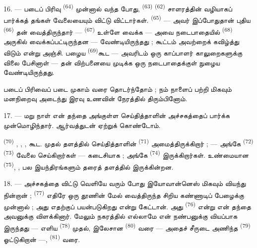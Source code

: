 16. --- படைப் பிரிவு  \textsuperscript{(64)}
முன்னால் வந்த போது,  \textsuperscript{(63)}
 \textsuperscript{(62)} சாளரத்தின் வழியாகப்
பார்க்கத் தங்கள்  வேலையையும்
விட்டு விட்டார்கள்.  \textsuperscript{(65)} —
அவர் இப்போதுதான் புதிய  \textsuperscript{(66)} தன்
 வைத்திருந்தார் —  \textsuperscript{(67)}  உள்ளே வைக்க — அவை நடைபாதையில்  \textsuperscript{(68)} அருகில் வைக்கப்பட்டிருந்தன —
வேண்டியிருந்தது ; கூட்டம் அவற்றைக் கவிழ்த்து விடும் என்று அஞ்சி.
பழைய 
\textsuperscript{(69)}கூட — அவரிடம் ஒரு காப்பாளர் காலுறைகளுக்கு
விலை பேசினாள் — தன் விற்பனையை முடிக்க ஒரு நடைபாதைக்குள் நுழைய
வேண்டியிருந்தது.

படைப் பிரிவைப் படை முகாம் வரை தொடர்ந்தோம் ;  நம்
நாளைப் பற்றி மிகவும் மனநிறைவு அடைந்து இரவு உணவின் நேரத்தில்
திரும்பினோம்.

\VUsaut{3.0mm}

17. --- மறு நாள் என் தந்தை அங்குள்ள செய்தித்தாளின் அச்சகத்தைப்
பார்க்க முன்மொழிந்தார். ஆர்வத்துடன் ஏற்றுக் கொண்டோம்.

  \textsuperscript{(70)}
, ,
,  கூட. முதல்
தளத்தில் செய்தித்தாளின் 
\textsuperscript{(71)} அமைத்திருக்கிறார் ;  — அங்கே 
\textsuperscript{(72)} 
\textsuperscript{(73)} வேலை செய்கிறார்கள் — கடைசியாக
 ; அங்கே  \textsuperscript{(74)} இருக்கிறார்கள். உண்மையான
 \textsuperscript{(75)}, , பல இயந்திரங்களும் தரைத் தளத்தில் இருக்கின்றன.

\VUsaut{3.0mm}

18. --- அச்சகத்தை விட்டு வெளியே வரும் போது இயோவான்னெஸ் மிகவும்
வியந்து நின்றான் ;  \textsuperscript{(77)}
எதிரே ஒரு தூணின் மேல் வைத்திருந்த சிறிய கண்ணாடிப் பேழைக்கு
முன்னால் ; அது எதற்குப் பயன்படுகிறது என்று கேட்டான். அது  \textsuperscript{(76)} என்று என் தந்தை அவனுக்கு
விளக்கினார். மேலும் நகரத்தில் எல்லாமே என் நண்பனுக்கு வியப்பாக
இருந்தது — எளிய  \textsuperscript{(78)}
முதல், இலேசான  \textsuperscript{(80)} வரை —
அதைச் சீருடை அணிந்த  \textsuperscript{(79)}
ஓட்டுகிறான் —,  \textsuperscript{(81)} வரை.

